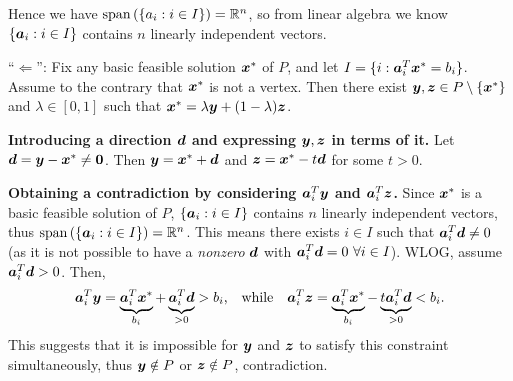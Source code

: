 \begin{enumerate}
\begin{pf}
Hence we have \(\operatorname{span}\left(\{a_i:i\in I\}\right)=\mathbb{R}^n\), so from linear algebra we know
\(\{\bm{a}_i:i\in I\}\) contains \(n\) linearly independent vectors.

``\(\Leftarrow\)'': Fix any basic feasible solution \(\bm{x}^*\) of \(P\),
and let \(I=\{i:\bm{a}_i^{T}\bm{x}^*=b_i\}\). Assume to the contrary that
\(\bm{x}^*\) is not a vertex. Then there exist \(\bm{y},\bm{z}\in
P\setminus \{\bm{x}^*\}\) and \(\lambda\in[0,1]\) such that
\(\bm{x}^*=\lambda\bm{y}+(1-\lambda)\bm{z}\).

\textbf{Introducing a direction \(\bm{d}\) and expressing
\(\bm{y},\bm{z}\) in terms of it.} Let \(\bm{d}=\bm{y}-\bm{x}^*\ne
\bm{0}\). Then \(\bm{y}=\bm{x}^*+\bm{d}\) and
\(\bm{z}=\bm{x}^*-t\bm{d}\) for some \(t>0\).
\begin{center}
\end{center}
\textbf{Obtaining a contradiction by considering \(\bm{a}_i^{T}\bm{y}\) and
\(\bm{a}_i^{T}\bm{z}\).}
Since \(\bm{x}^*\) is a basic feasible solution of \(P\), \(\{\bm{a}_i:i\in I\}\)
contains \(n\) linearly independent vectors, thus \(\operatorname{span}\left(\{\bm{a}_i:i\in
I\}\right)=\mathbb{R}^n\). This means there exists \(i\in I\) such that
\(\bm{a}_i^{T}\bm{d}\ne 0\) (as it is not possible to have a
\emph{nonzero} \(\bm{d}\) with \(\bm{a}_i^{T}\bm{d}=0~\forall i\in I\)).
WLOG, assume \(\bm{a}_i^{T}\bm{d}>0\). Then,
\[
\bm{a}_i^{T}\bm{y}=\underbrace{\bm{a}_i^{T}\bm{x}^*}_{b_i}
+\underbrace{\bm{a}_i^{T}\bm{d}}_{>0}
>b_i\text{,\quad while\quad}
\bm{a}_i^{T}\bm{z}=\underbrace{\bm{a}_i^{T}\bm{x}^*}_{b_i}
-\underbrace{t\bm{a}_i^{T}\bm{d}}_{>0}
<b_i.
\]
This suggests that it is impossible for \(\bm{y}\) and \(\bm{z}\) to
satisfy this constraint simultaneously, thus \(\bm{y}\notin P\) or
\(\bm{z}\notin P\), contradiction.
\end{pf}


\end{enumerate}
